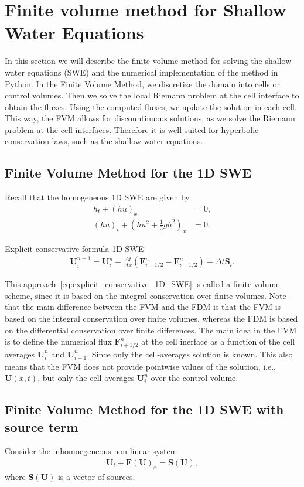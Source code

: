 \section{Finite volume method for Shallow Water Equations}
In this section we will describe the finite volume method for solving the shallow water equations (SWE) and the numerical implementation of the method in Python.
In the Finite Volume Method, we discretize the domain into cells or control volumes.
Then we solve the local Riemann problem at the cell interface to obtain the fluxes.
Using the computed fluxes, we update the solution in each cell.
This way, the FVM allows for discountinuous solutions, as we solve the Riemann problem at the cell interfaces.
Therefore it is well suited for hyperbolic conservation laws, such as the shallow water equations.


\subsection{Finite Volume Method for the 1D SWE}
Recall that the homogeneous 1D SWE are given by
\begin{align*}
    h_t + {(hu)}_x &= 0, \\
    {(hu)}_t + {\left(hu^2 + \frac{1}{2}gh^2\right)}_x &= 0.
\end{align*}

Explicit conservative formula 1D SWE
\begin{align}\label{eq:explicit_conservative_1D_SWE}
    \mathbf{U}_i^{n+1} = \mathbf{U}_i^n - \frac{\Delta t}{\Delta x} \left( \mathbf{F}_{i+1/2}^n - \mathbf{F}_{i-1/2}^n \right) + \Delta t \mathbf{S}_i.
\end{align}

This approach~\eqref{eq:explicit_conservative_1D_SWE} is called a finite volume scheme, since it is based on the integral conservation over finite volumes.
Note that the main difference between the FVM and the FDM is that the FVM is based on the integral conservation over finite volumes, whereas the FDM is based on the differential conservation over finite differences.
The main idea in the FVM is to define the numerical flux $\mathbf{F}_{i+1/2}^n$ at the cell inerface as a function of the cell averages $\mathbf{U}_i^n$ and $\mathbf{U}_{i+1}^n$.
Since only the cell-averages solution is known.
This also means that the FVM does not provide pointwise values of the solution, i.e., $\mathbf{U}(x,t)$, but only the cell-averages $\mathbf{U}_i^n$ over the control volume.

\subsection{Finite Volume Method for the 1D SWE with source term}
Consider the inhomoegeneous non-linear system
\begin{align*}
    \mathbf{U}_t + \mathbf{F(U)}_x = \mathbf{S(U)},
\end{align*} 
where $\mathbf{S(U)}$ is a vector of sources. 



